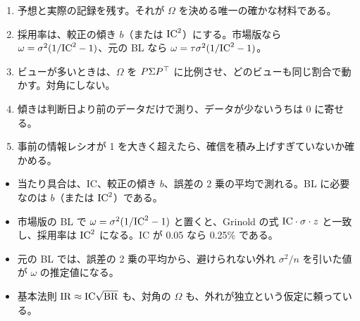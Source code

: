 \begin{tipbox}
\begin{enumerate}
\item 予想と実際の記録を残す。それが $\Omega$ を決める唯一の確かな材料である。
\item 採用率は、較正の傾き $b$（または $\mathrm{IC}^2$）にする。市場版なら $\omega=\sigma^2(1/\mathrm{IC}^2-1)$、元の BL なら $\omega=\tau\sigma^2(1/\mathrm{IC}^2-1)$。
\item ビューが多いときは、$\Omega$ を $P\Sigma P^{\top}$ に比例させ、どのビューも同じ割合で動かす。対角にしない。
\item 傾きは判断日より前のデータだけで測り、データが少ないうちは 0 に寄せる。
\item 事前の情報レシオが 1 を大きく超えたら、確信を積み上げすぎていないか確かめる。
\end{enumerate}
\end{tipbox}

\begin{keybox}[この章のまとめ]
\begin{itemize}
\item 当たり具合は、IC、較正の傾き $b$、誤差の 2 乗の平均で測れる。BL に必要なのは $b$（または $\mathrm{IC}^2$）である。
\item 市場版の BL で $\omega=\sigma^2(1/\mathrm{IC}^2-1)$ と置くと、Grinold の式 $\mathrm{IC}\cdot\sigma\cdot z$ と一致し、採用率は $\mathrm{IC}^2$ になる。IC が 0.05 なら 0.25\% である。
\item 元の BL では、誤差の 2 乗の平均から、避けられない外れ $\sigma^2/n$ を引いた値が $\omega$ の推定値になる。
\item 基本法則 $\mathrm{IR}\approx\mathrm{IC}\sqrt{\mathrm{BR}}$ も、対角の $\Omega$ も、外れが独立という仮定に頼っている。
\end{itemize}
\end{keybox}
